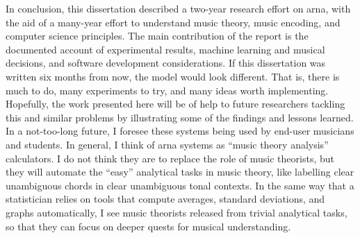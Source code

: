 
In conclusion, this dissertation described a two-year
research effort on \gls{arna}, with the aid of a many-year
effort to understand music theory, music encoding, and
computer science principles. The main contribution of the
report is the documented account of experimental results,
machine learning and musical decisions, and software
development considerations. If this dissertation was written
six months from now, the model would look different. That
is, there is much to do, many experiments to try, and many
ideas worth implementing. Hopefully, the work presented here
will be of help to future researchers tackling this and
similar problems by illustrating some of the findings and
lessons learned. In a not-too-long future, I foresee these
systems being used by end-user musicians and students. In
general, I think of \gls{arna} systems as ``music theory
analysis'' calculators. I do not think they are to replace
the role of music theorists, but they will automate the
``easy'' analytical tasks in music theory, like labelling
clear unambiguous chords in clear unambiguous tonal
contexts. In the same way that a statistician relies on
tools that compute averages, standard deviations, and graphs
automatically, I see music theorists released from trivial
analytical tasks, so that they can focus on deeper quests
for musical understanding.
